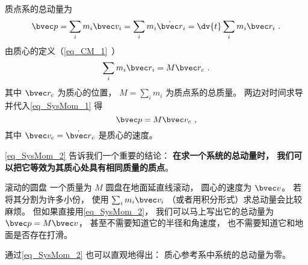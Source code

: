 

质点系的总动量为
\begin{equation}\label{eq_SysMom_1}
\bvec p = \sum_i m_i \bvec v_i = \sum_i m_i \dot{\bvec r}_i = \dv{t}  \sum_i m_i \bvec r_i~.
\end{equation}
由质心的定义（\autoref{eq_CM_1}~） 
\begin{equation}
\sum_i m_i \bvec r_i = M \bvec r_c~.
\end{equation}
其中 $\bvec r_c$ 为质心的位置， $M = \sum_i m_i$ 为质点系的总质量。 两边对时间求导并代入\autoref{eq_SysMom_1} 得
\begin{equation}\label{eq_SysMom_2}
\bvec p = M\bvec v_c~,
\end{equation}
其中 $\bvec v_c = \dot{\bvec r}_c$ 是质心的速度。

\autoref{eq_SysMom_2} 告诉我们一个重要的结论： \textbf{在求一个系统的总动量时， 我们可以把它等效为其质心处具有相同质量的质点}。

\begin{example}{滚动的圆盘}
一个质量为 $M$ 圆盘在地面延直线滚动， 圆心的速度为 $\bvec v$。 若将其分割为许多小份， 使用 $\sum_i m_i \bvec v_i$ （或者用积分形式）求总动量会比较麻烦。 但如果直接用\autoref{eq_SysMom_2}， 我们可以马上写出它的总动量为 $\bvec p = M\bvec v$， 甚至不需要知道它的半径和角速度， 也不需要知道它和地面是否存在打滑。
\end{example}

通过\autoref{eq_SysMom_2} 也可以直观地得出： 质心参考系中系统的总动量为零。
